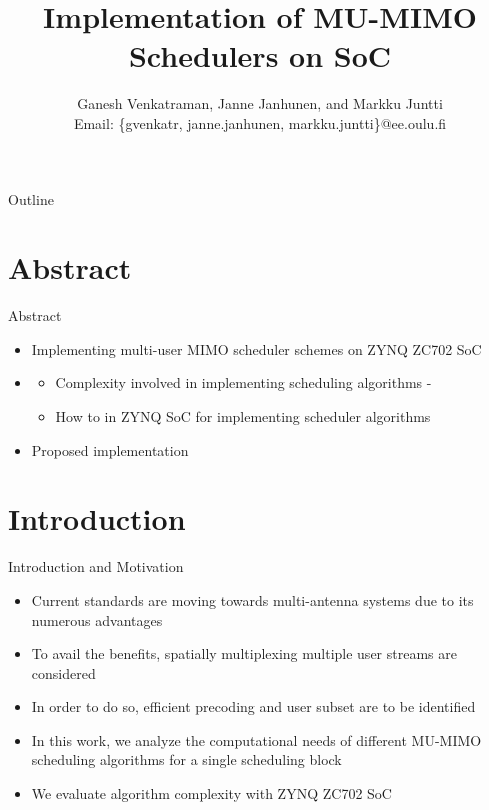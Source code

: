 \documentclass[11pt]{beamer}
\title{Implementation of MU-MIMO Schedulers on SoC}
\author{{Ganesh Venkatraman, Janne Janhunen, and Markku Juntti} \\ \scriptsize{Email: \{gvenkatr, janne.janhunen, markku.juntti\}@ee.oulu.fi}}
\begin{document}
\begin{frame}
    \titlepage
\end{frame}

\begin{frame}{Outline} \scriptsize
    \tableofcontents
\end{frame}

  

\section{Abstract}

\begin{frame}{Abstract}
	\begin{itemize}
		\item {} Implementing multi-user MIMO scheduler schemes on ZYNQ ZC702 SoC
		\item {}
			\begin{itemize}
				\item Complexity involved in implementing scheduling algorithms - 
				\item How to  in ZYNQ SoC for implementing scheduler algorithms
			\end{itemize}
		\item {} Proposed implementation 
	\end{itemize}
\end{frame}

\section{Introduction}

\begin{frame}{Introduction and Motivation}
\begin{itemize}
\item Current standards are moving towards multi-antenna systems due to its numerous advantages
\item To avail the benefits, spatially multiplexing multiple user streams are considered
\item In order to do so, efficient precoding and user subset are to be identified
\item In this work, we analyze the computational needs of different MU-MIMO scheduling algorithms for a single scheduling block
\item We evaluate algorithm complexity with ZYNQ ZC702 SoC
\end{itemize}
\end{frame}
\end{document}
